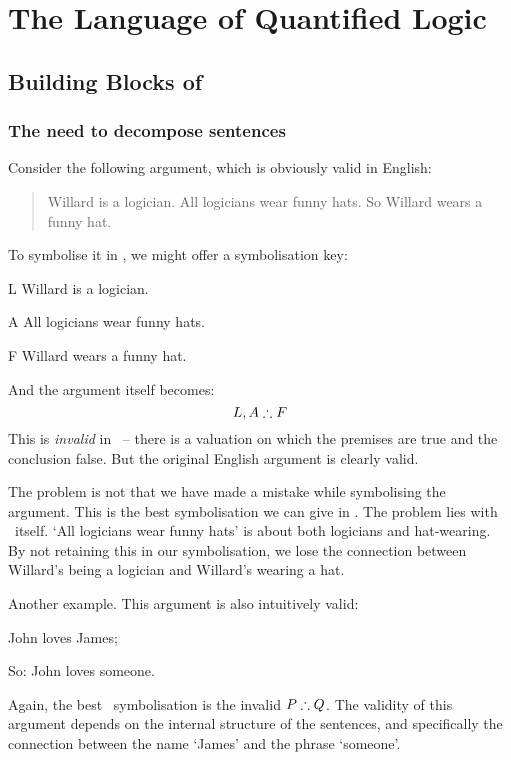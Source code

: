\part{The Language of Quantified Logic}
\label{ch.FOL}
\chapter{Building Blocks of \textnormal{\FOL}}\label{s:FOLBuildingBlocks}
\section{The need to decompose sentences}
Consider the following argument, which is obviously valid in English:
\begin{quote}
\label{willard1}
Willard is a logician. All logicians wear funny hats. So Willard wears a funny hat.
\end{quote}
To symbolise it in \TFL, we might offer a symbolisation key:
\begin{ekey}
\item[L] Willard is a logician.
\item[A] All logicians wear funny hats.
\item[F] Willard wears a funny hat.
\end{ekey}
And the argument itself becomes:
$$L, A \mathrel{\therefore} F$$
This is \emph{invalid} in \TFL\ – there is a valuation on which the premises are true and the conclusion false. But the original English argument is clearly valid.

The problem is not that we have made a mistake while symbolising the argument. This is the best symbolisation we can give in \TFL. The problem lies with \TFL\ itself. `All logicians wear funny hats' is about both logicians and hat-wearing. By not retaining this in our symbolisation, we lose the connection between Willard's being a logician and Willard's wearing a hat.

Another example. This argument is also intuitively valid:
\begin{earg}
	\item[] John loves James;
	\item[So:] John loves someone.
\end{earg} Again, the best \TFL\ symbolisation is the invalid $P \mathrel{\therefore} Q$. The validity of this argument depends on the internal structure of the sentences, and specifically the connection between the name `James' and the phrase `someone'.

